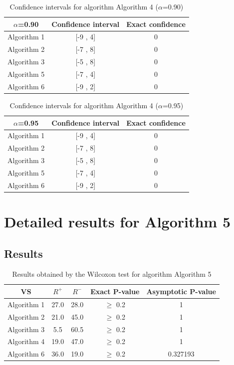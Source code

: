 \documentclass[a4paper,10pt]{article}
\begin{document}
\begin{table}[!htp]
\centering\small
\begin{tabular}{
|c|c|c|}
\hline
 $\alpha$=0.90 & Confidence interval & Exact confidence \\ \hline 
Algorithm 1 & [-9 , 4] & 0\\ \hline 
Algorithm 2 & [-7 , 8] & 0\\ \hline 
Algorithm 3 & [-5 , 8] & 0\\ \hline 
Algorithm 5 & [-7 , 4] & 0\\ \hline 
Algorithm 6 & [-9 , 2] & 0\\ \hline 

\end{tabular}
\caption{Confidence intervals for algorithm Algorithm 4 ($\alpha$=0.90)}
\end{table}
\begin{table}[!htp]
\centering\small
\begin{tabular}{
|c|c|c|}
\hline
 $\alpha$=0.95 & Confidence interval & Exact confidence \\ \hline 
Algorithm 1 & [-9 , 4] & 0\\ \hline 
Algorithm 2 & [-7 , 8] & 0\\ \hline 
Algorithm 3 & [-5 , 8] & 0\\ \hline 
Algorithm 5 & [-7 , 4] & 0\\ \hline 
Algorithm 6 & [-9 , 2] & 0\\ \hline 

\end{tabular}
\caption{Confidence intervals for algorithm Algorithm 4 ($\alpha$=0.95)}
\end{table}

 \clearpage 


\section{Detailed results for Algorithm 5}


\subsection{Results}

\begin{table}[!htp]
\centering\small
\begin{tabular}{
|c|c|c|c|c|}
\hline
 VS & $R^{+}$ & $R^{-}$ & Exact P-value & Asymptotic P-value \\ \hline 
Algorithm 1 & 27.0 & 28.0 & $\geq$ 0.2 & 1\\ \hline 
Algorithm 2 & 21.0 & 45.0 & $\geq$ 0.2 & 1\\ \hline 
Algorithm 3 & 5.5 & 60.5 & $\geq$ 0.2 & 1\\ \hline 
Algorithm 4 & 19.0 & 47.0 & $\geq$ 0.2 & 1\\ \hline 
Algorithm 6 & 36.0 & 19.0 & $\geq$ 0.2 & 0.327193\\ \hline 

\end{tabular}
\caption{Results obtained by the Wilcoxon test for algorithm Algorithm 5}
\end{table}
\end{document}
